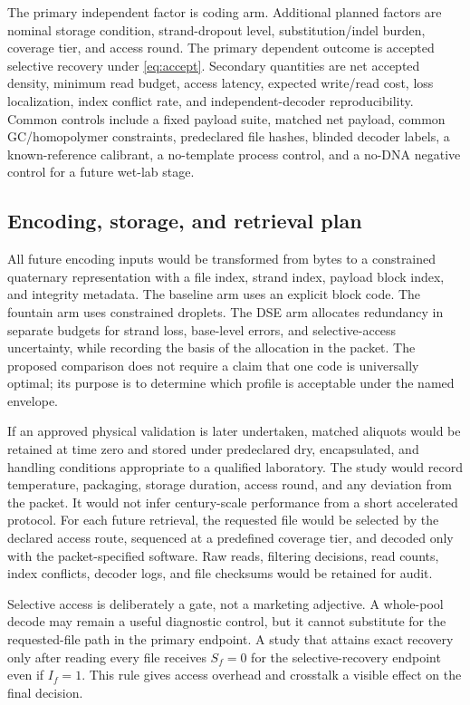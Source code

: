 \documentclass[conference]{IEEEtran}
\begin{document}
The primary independent factor is coding arm. Additional planned factors are nominal storage condition, strand-dropout level, substitution/indel burden, coverage tier, and access round. The primary dependent outcome is accepted selective recovery under \eqref{eq:accept}. Secondary quantities are net accepted density, minimum read budget, access latency, expected write/read cost, loss localization, index conflict rate, and independent-decoder reproducibility. Common controls include a fixed payload suite, matched net payload, common GC/homopolymer constraints, predeclared file hashes, blinded decoder labels, a known-reference calibrant, a no-template process control, and a no-DNA negative control for a future wet-lab stage.

\subsection{Encoding, storage, and retrieval plan}

All future encoding inputs would be transformed from bytes to a constrained quaternary representation with a file index, strand index, payload block index, and integrity metadata. The baseline arm uses an explicit block code. The fountain arm uses constrained droplets. The DSE arm allocates redundancy in separate budgets for strand loss, base-level errors, and selective-access uncertainty, while recording the basis of the allocation in the packet. The proposed comparison does not require a claim that one code is universally optimal; its purpose is to determine which profile is acceptable under the named envelope.

If an approved physical validation is later undertaken, matched aliquots would be retained at time zero and stored under predeclared dry, encapsulated, and handling conditions appropriate to a qualified laboratory. The study would record temperature, packaging, storage duration, access round, and any deviation from the packet. It would not infer century-scale performance from a short accelerated protocol. For each future retrieval, the requested file would be selected by the declared access route, sequenced at a predefined coverage tier, and decoded only with the packet-specified software. Raw reads, filtering decisions, read counts, index conflicts, decoder logs, and file checksums would be retained for audit.

Selective access is deliberately a gate, not a marketing adjective. A whole-pool decode may remain a useful diagnostic control, but it cannot substitute for the requested-file path in the primary endpoint. A study that attains exact recovery only after reading every file receives $S_f=0$ for the selective-recovery endpoint even if $I_f=1$. This rule gives access overhead and crosstalk a visible effect on the final decision.
\end{document}
